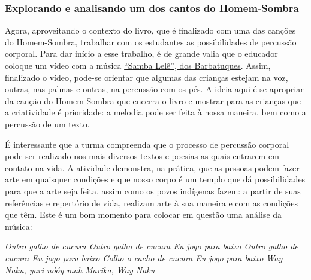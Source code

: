 \documentclass[11pt]{extarticle}
\begin{document}
\subsubsection{Explorando e analisando um dos cantos do Homem-Sombra}


Agora, aproveitando o contexto do livro, que é finalizado com uma das canções do Homem-Sombra, trabalhar com os estudantes as possibilidades de percussão corporal. Para dar início a esse trabalho, é de grande valia que o educador coloque um vídeo com a música \href{https://www.youtube.com/watch?v=_Tz7KROhuAw}{``Samba Lelê'', dos Barbatuques}. Assim, finalizado o vídeo, pode-se orientar que algumas das crianças estejam na voz, outras, nas palmas e outras, na percussão com os pés. A ideia aqui é se apropriar da canção do Homem-Sombra que encerra o livro e mostrar para as crianças que a criatividade é prioridade: a melodia pode ser feita à nossa maneira, bem como a percussão de um texto. 




É interessante que a turma compreenda que o processo de percussão corporal pode ser realizado nos mais diversos textos e poesias as quais entrarem em contato na vida. A atividade demonstra, na prática, que as pessoas podem fazer arte em quaisquer condições e que nosso corpo é um templo que dá possibilidades para que a arte seja feita, assim como os povos indígenas fazem: a partir de suas referências e repertório de vida, realizam arte à sua maneira e com as condições que têm. Este é um bom momento para colocar em questão uma análise da música: 

\textit{Outro galho de cucura
Outro galho de cucura
Eu jogo para baixo
Outro galho de cucura
Eu jogo para baixo
Colho o cacho de cucura
Eu jogo para baixo
Way Naku, yari nóóy mah
Marika, Way Naku}
\end{document}
